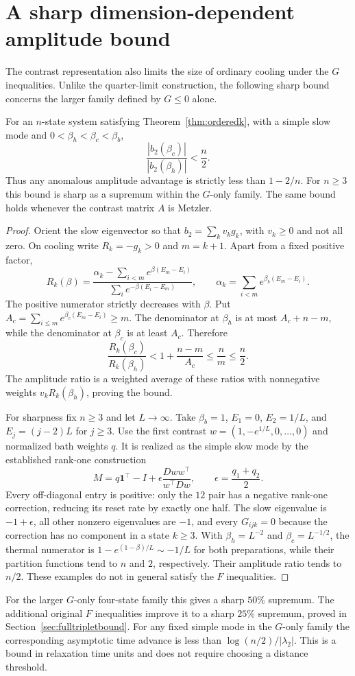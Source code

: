 \section{A sharp dimension-dependent amplitude bound}\label{sec:amplitudebound}
The contrast representation also limits the size of ordinary cooling under
the $G$ inequalities. Unlike the quarter-limit construction, the following
sharp bound concerns the larger family defined by $G\leq0$ alone.

\begin{theorem}\label{thm:amplitudebound}
For an $n$-state system satisfying Theorem~\ref{thm:orderedk}, with a simple
slow mode and $0<\beta_h<\beta_c<\beta_b$,
\[
\frac{|b_2(\beta_c)|}{|b_2(\beta_h)|}<\frac n2.
\]
Thus any anomalous amplitude advantage is strictly less than $1-2/n$.
For $n\geq3$ this bound is sharp as a supremum within the $G$-only family.
The same bound holds whenever the contrast matrix $A$ is Metzler.
\end{theorem}
\begin{proof}
Orient the slow eigenvector so that $b_2=\sum_k v_kg_k$, with $v_k\geq0$
and not all zero. On cooling write $R_k=-g_k>0$ and $m=k+1$.
Apart from a fixed positive factor,
\[
R_k(\beta)=\frac{\alpha_k-\sum_{i<m}e^{\beta(E_m-E_i)}}
{\sum_i e^{-\beta(E_i-E_m)}},\qquad
\alpha_k=\sum_{i<m}e^{\beta_b(E_m-E_i)}.
\]
The positive numerator strictly decreases with $\beta$. Put
$A_c=\sum_{i\leq m}e^{\beta_c(E_m-E_i)}\geq m$. The denominator at
$\beta_h$ is at most $A_c+n-m$, while the denominator at $\beta_c$ is at
least $A_c$. Therefore
\[
\frac{R_k(\beta_c)}{R_k(\beta_h)}
<1+\frac{n-m}{A_c}\leq\frac nm\leq\frac n2.
\]
The amplitude ratio is a weighted average of these ratios with nonnegative
weights $v_kR_k(\beta_h)$, proving the bound.

For sharpness fix $n\geq3$ and let $L\to\infty$. Take $\beta_b=1$,
$E_1=0$, $E_2=1/L$, and $E_j=(j-2)L$ for $j\geq3$.
Use the first contrast $w=(1,-e^{1/L},0,\ldots,0)$ and normalized bath
weights $q$. It is realized as the simple slow mode by the established
rank-one construction
\[
M=q\mathbf1^\top-I+\epsilon\frac{Dww^\top}{w^\top Dw},
\qquad \epsilon=\frac{q_1+q_2}{2}.
\]
Every off-diagonal entry is positive: only the $12$ pair has a negative
rank-one correction, reducing its reset rate by exactly one half.
The slow eigenvalue is $-1+\epsilon$, all other nonzero eigenvalues are
$-1$, and every $G_{ijk}=0$ because the correction has no component in a
state $k\geq3$. With $\beta_h=L^{-2}$ and $\beta_c=L^{-1/2}$, the thermal
numerator is
$1-e^{(1-\beta)/L}\sim-1/L$ for both preparations, while their partition
functions tend to $n$ and $2$, respectively. Their amplitude ratio tends
to $n/2$. These examples do not in general satisfy the $F$ inequalities.
\end{proof}

For the larger $G$-only four-state family this gives a sharp $50\%$ supremum.
The additional original $F$ inequalities improve it to a sharp $25\%$
supremum, proved in Section~\ref{sec:fulltripletbound}. For any fixed simple
mode in the $G$-only family the corresponding asymptotic time
advance is less than $\log(n/2)/|\lambda_2|$. This is a bound in relaxation
time units and does not require choosing a distance threshold.
